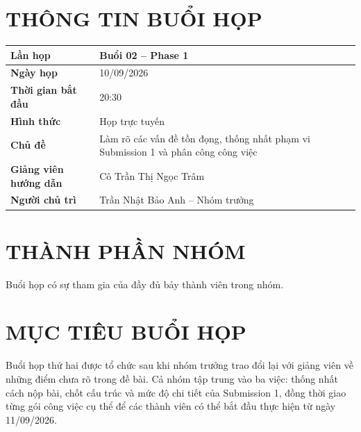 \documentclass[10pt,a4paper]{article}
\begin{document}
\MakeHCMUTCover

\section{THÔNG TIN BUỔI HỌP}

\begin{table}[htbp]
  \centering
  \begin{tabularx}{\textwidth}{|>{\bfseries}L{45mm}|Y|}
    \hline
    Lần họp & Buổi 02 -- Phase 1\\
    \hline
    Ngày họp & 10/09/2026\\
    \hline
    Thời gian bắt đầu & 20:30\\
    \hline
    Hình thức & Họp trực tuyến\\
    \hline
    Chủ đề & Làm rõ các vấn đề tồn đọng, thống nhất phạm vi Submission 1 và phân công công việc\\
    \hline
    Giảng viên hướng dẫn & Cô Trần Thị Ngọc Trâm\\
    \hline
    Người chủ trì & Trần Nhật Bảo Anh -- Nhóm trưởng\\
    \hline
  \end{tabularx}
\end{table}

\section{THÀNH PHẦN NHÓM}

\begin{HCMUTMemberTable}
\end{HCMUTMemberTable}

\noindent Buổi họp có sự tham gia của đầy đủ bảy thành viên trong nhóm.

\section{MỤC TIÊU BUỔI HỌP}

Buổi họp thứ hai được tổ chức sau khi nhóm trưởng trao đổi lại với giảng viên về những điểm chưa rõ trong đề bài. Cả nhóm tập trung vào ba việc: thống nhất cách nộp bài, chốt cấu trúc và mức độ chi tiết của Submission 1, đồng thời giao từng gói công việc cụ thể để các thành viên có thể bắt đầu thực hiện từ ngày 11/09/2026.
\end{document}
